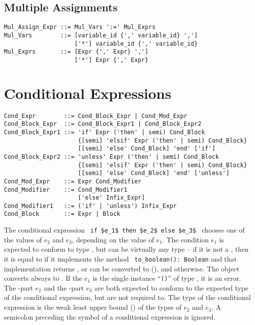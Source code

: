 \subsection{Multiple Assignments}
\label{sec:multiple-assignments}

\syntax\begin{lstlisting}
Mul_Assign_Expr ::= Mul_Vars ':=' Mul_Exprs
Mul_Vars        ::= [variable_id {',' variable_id} ',']
                    ['*'] variable_id {',' variable_id}
Mul_Exprs       ::= [Expr {',' Expr} ',']
                    ['*'] Expr {',' Expr}
\end{lstlisting}






\section{Conditional Expressions}
\label{sec:conditional-expressions}

\syntax\begin{lstlisting}
Cond_Expr        ::= Cond_Block_Expr | Cond_Mod_Expr
Cond_Block_Expr  ::= Cond_Block_Expr1 | Cond_Block_Expr2
Cond_Block_Expr1 ::= 'if' Expr ('then' | semi) Cond_Block 
                     {[semi] 'elsif' Expr ('then' | semi) Cond_Block}
                     [[semi] 'else' Cond_Block] 'end' ['if']
Cond_Block_Expr2 ::= 'unless' Expr ('then' | semi) Cond_Block 
                     {[semi] 'elsif' Expr ('then' | semi) Cond_Block}
                     [[semi] 'else' Cond_Block] 'end' ['unless']
Cond_Mod_Expr    ::= Expr Cond_Modifier
Cond_Modifier    ::= Cond_Modifier1
                     ['else' Infix_Expr]
Cond_Modifier1   ::= ('if' | 'unless') Infix_Expr 
Cond_Block       ::= Expr | Block
\end{lstlisting}

The conditional expression ~\lstinline!if $e_1$ then $e_2$ else $e_3$!~ chooses one of the values of $e_2$ and $e_3$, depending on the value of $e_1$. The condition $e_1$ is expected to conform to type , but can be virtually any type -- if it is not a , then it is equal to  if it implements the method ~\lstinline!to_boolean(): Boolean! and that implementation returns , or can be converted to  (), and  otherwise. The  object converts always to . If the $e_1$ is the single instance ``\lstinline!()!'' of type , it is an error. The -part $e_2$ and the -part $e_3$ are both expected to conform to the expected type of the conditional expression, but are not required to. The type of the conditional expression is the weak least upper bound () of the types of $e_2$ and $e_3$. A semicolon preceding the  symbol of a conditional expression is ignored. 

